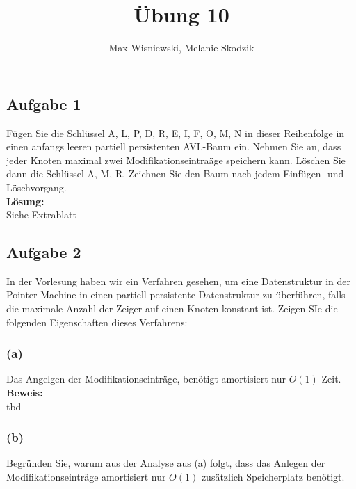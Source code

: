 \documentclass[11pt,a4paper,ngerman]{article}
\date{}
\title{Übung 10}
\author{Max Wisniewski, Melanie Skodzik}
\begin{document}

\renewcommand{\figurename}{Grafik}

\maketitle
\thispagestyle{fancy}


\subsection*{Aufgabe 1}
Fügen Sie die Schlüssel A, L, P, D, R, E, I, F, O, M, N in dieser Reihenfolge in einen anfangs leeren partiell persistenten AVL-Baum ein. Nehmen Sie an, dass jeder Knoten maximal zwei Modifikationseintraäge speichern kann. Löschen Sie dann die Schlüssel A, M, R. Zeichnen Sie den Baum nach jedem Einfügen- und Löschvorgang.\\

\noindent\textbf{Lösung:}\\
Siehe Extrablatt

\subsection*{Aufgabe 2}
In der Vorlesung haben wir ein Verfahren gesehen, um eine Datenstruktur in der Pointer Machine in einen partiell persistente Datenstruktur zu überführen, falls die maximale Anzahl der Zeiger auf einen Knoten konstant ist. Zeigen SIe die folgenden Eigenschaften dieses Verfahrens:

\subsubsection*{(a)}
Das Angelgen der Modifikationseinträge, benötigt amortisiert nur $O(1)$ Zeit.\\

\noindent\textbf{Beweis:}\\
tbd

\subsubsection*{(b)}
Begründen Sie, warum aus der Analyse aus (a) folgt, dass das Anlegen der Modifikationseinträge amortisiert nur $O(1)$ zusätzlich Speicherplatz benötigt.\\
\end{document}
